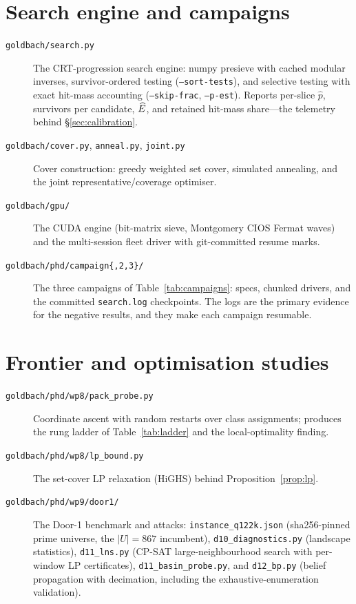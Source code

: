 \section{Search engine and campaigns}

\begin{description}
\item[\texttt{goldbach/search.py}] The CRT-progression search engine: numpy
presieve with cached modular inverses, survivor-ordered testing
(\texttt{--sort-tests}), and selective testing with exact hit-mass accounting
(\texttt{--skip-frac}, \texttt{--p-est}). Reports per-slice $\hat p$,
survivors per candidate, $\widehat{E}$, and retained hit-mass share---the telemetry
behind \S\ref{sec:calibration}.
\item[\texttt{goldbach/cover.py}, \texttt{anneal.py}, \texttt{joint.py}]
Cover construction: greedy weighted set cover, simulated annealing, and the
joint representative/coverage optimiser.
\item[\texttt{goldbach/gpu/}] The CUDA engine (bit-matrix sieve, Montgomery CIOS
Fermat waves) and the multi-session fleet driver with git-committed resume
marks.
\item[\texttt{goldbach/phd/campaign\{,2,3\}/}] The three campaigns of
Table~\ref{tab:campaigns}: specs, chunked drivers, and the committed
\texttt{search.log} checkpoints. The logs are the primary evidence for the
negative results, and they make each campaign resumable.
\end{description}

\section{Frontier and optimisation studies}

\begin{description}
\item[\texttt{goldbach/phd/wp8/pack\_probe.py}] Coordinate ascent with random
restarts over class assignments; produces the rung ladder of
Table~\ref{tab:ladder} and the local-optimality finding.
\item[\texttt{goldbach/phd/wp8/lp\_bound.py}] The set-cover LP relaxation
(HiGHS) behind Proposition~\ref{prop:lp}.
\item[\texttt{goldbach/phd/wp9/door1/}] The Door-1 benchmark and attacks:
\texttt{instance\_q122k.json} (sha256-pinned prime universe, the $|U|=867$
incumbent), \texttt{d10\_diagnostics.py} (landscape statistics),
\texttt{d11\_lns.py} (CP-SAT large-neighbourhood search with per-window LP
certificates), \texttt{d11\_basin\_probe.py}, and \texttt{d12\_bp.py} (belief
propagation with decimation, including the exhaustive-enumeration validation).
\end{description}

